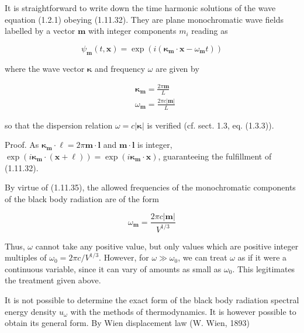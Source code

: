 \documentclass{article}
\begin{document}
It is straightforward to write down the time harmonic solutions of the wave equation (1.2.1) obeying (1.11.32). They are plane monochromatic wave fields
labelled by a vector $\boldsymbol{m}$ with integer components $m_{i}$ reading as
 
\begin{equation*}
\psi_{\boldsymbol{m}}(t, \boldsymbol{x})=\exp \left(i\left(\boldsymbol{\kappa}_{\boldsymbol{m}} \cdot \boldsymbol{x}-\omega_{\boldsymbol{m}} t\right)\right) \tag{1.11.33}
\end{equation*}
 
where the wave vector $\boldsymbol{\kappa}$ and frequency $\omega$ are given by
 
\begin{align*}
& \boldsymbol{\kappa}_{\boldsymbol{m}}=\frac{2 \pi \boldsymbol{m}}{L}  \tag{1.11.34}\\
& \omega_{\boldsymbol{m}}=\frac{2 \pi c|\boldsymbol{m}|}{L} \tag{1.11.35}
\end{align*}
 
so that the dispersion relation $\omega=c|\boldsymbol{\kappa}|$ is verified (cf. sect. 1.3, eq. (1.3.3)).

Proof. As $\boldsymbol{\kappa}_{\boldsymbol{m}} \cdot \boldsymbol{\ell}=2 \pi \boldsymbol{m} \cdot \boldsymbol{l}$ and $\boldsymbol{m} \cdot \boldsymbol{l}$ is integer, $\exp \left(i \boldsymbol{\kappa}_{\boldsymbol{m}} \cdot(\boldsymbol{x}+\boldsymbol{\ell})\right)=\exp \left(i \boldsymbol{\kappa}_{\boldsymbol{m}} \cdot \boldsymbol{x}\right)$, guaranteeing the fulfillment of (1.11.32).

By virtue of (1.11.35), the allowed frequencies of the monochromatic components of the black body radiation are of the form
 
\begin{equation*}
\omega_{\boldsymbol{m}}=\frac{2 \pi c|\boldsymbol{m}|}{V^{1 / 3}} \tag{1.11.36}
\end{equation*}
 

Thus, $\omega$ cannot take any positive value, but only values which are positive integer multiples of $\omega_{0}=2 \pi c / V^{1 / 3}$. However, for $\omega \gg \omega_{0}$, we can treat $\omega$ as if it were a continuous variable, since it can vary of amounts as small as $\omega_{0}$. This legitimates the treatment given above.

It is not possible to determine the exact form of the black body radiation spectral energy density $u_{\omega}$ with the methods of thermodynamics. It is however possible to obtain its general form. By Wien displacement law (W. Wien, 1893)
 
\end{document}
